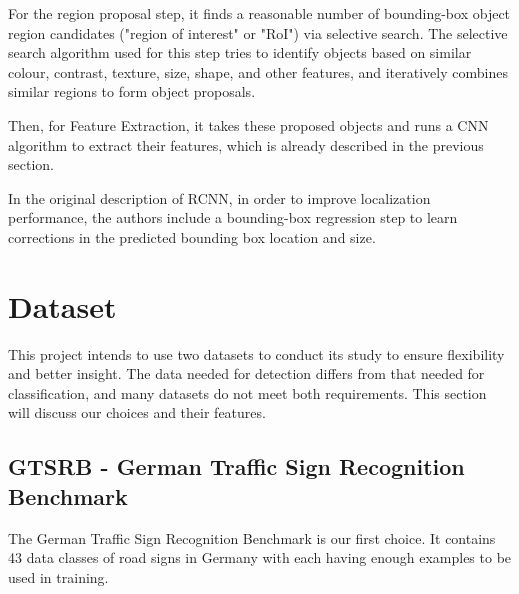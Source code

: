 \documentclass[12pt, landscape]{article}
\begin{document}
\begin{multicols}{3}
For the region proposal step, it finds a reasonable number of bounding-box
object region candidates ("region of interest" or "RoI") via selective search.
The selective search algorithm used for this step tries to identify objects
based on similar colour, contrast, texture, size, shape, and other features, and
iteratively combines similar regions to form object proposals.

Then, for Feature Extraction, it takes these proposed objects and runs a CNN
algorithm to extract their features, which is already described in the previous
section.

In the original description of RCNN, in order to improve localization
performance, the authors include a bounding-box regression step to learn
corrections in the predicted bounding box location and size.

\section{Dataset}
This project intends to use two datasets to conduct its study to ensure
flexibility and better insight. The data needed for detection differs from that
needed for classification, and many datasets do not meet both requirements. This
section will discuss our choices and their features.
\subsection{GTSRB - German Traffic Sign Recognition Benchmark}
The German Traffic Sign Recognition Benchmark is our first choice. It contains
43 data classes of road signs in Germany with each having enough examples to be
used in training.


\end{multicols}
\end{document}
